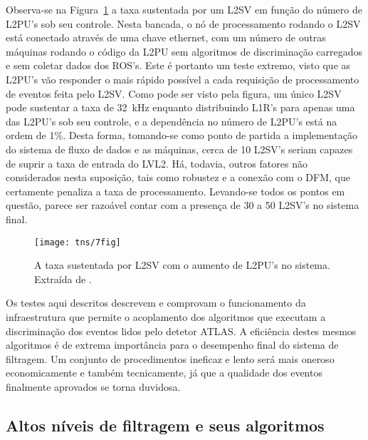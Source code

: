 Observa-se na Figura~\ref{fig:tns-7fig} a taxa sustentada por um L2SV em
função do número de L2PU's sob seu controle. Nesta bancada, o nó de
processamento rodando o L2SV está conectado através de uma chave 
ethernet, com um número de outras máquinas rodando o código da L2PU sem
algoritmos de discriminação carregados e sem coletar dados dos ROS's. Este é
portanto um teste extremo, visto que as L2PU's vão responder o mais rápido
possível a cada requisição de processamento de eventos feita pelo L2SV. Como
pode ser visto pela figura, um único L2SV pode sustentar a taxa de 32~kHz
enquanto distribuindo L1R's para apenas uma das L2PU's sob seu controle, e a
dependência no número de L2PU's está na ordem de 1\%. Desta forma, tomando-se
como ponto de partida a implementação do sistema de fluxo de dados e as
máquinas, cerca de 10 L2SV's seriam capazes de suprir a taxa de entrada do
LVL2. Há, todavia, outros fatores não considerados nesta suposição, tais como
robustez e a conexão com o DFM, que certamente penaliza a taxa de
processamento. Levando-se todos os pontos em questão, parece ser razoável
contar com a presença de 30 a 50 L2SV's no sistema final.

\begin{figure}
\begin{center}
\texttt{[image: tns/7fig]}
\end{center}
\caption{A taxa sustentada por L2SV com o aumento de L2PU's no
sistema. Extraída de \cite{aa:tns-2004}.}
\label{fig:tns-7fig}
\end{figure}

Os testes aqui descritos descrevem e comprovam o funcionamento da
infraestrutura que permite o acoplamento dos algoritmos que executam a
discriminação dos eventos lidos pelo detetor ATLAS. A eficiência destes mesmos
algoritmos é de extrema importância para o desempenho final do sistema de
filtragem. Um conjunto de procedimentos ineficaz e lento será mais oneroso
economicamente e também tecnicamente, já que a qualidade dos eventos
finalmente aprovados se torna duvidosa.

\subsection{Altos níveis de filtragem e seus algoritmos}
\label{sec:hlt}

